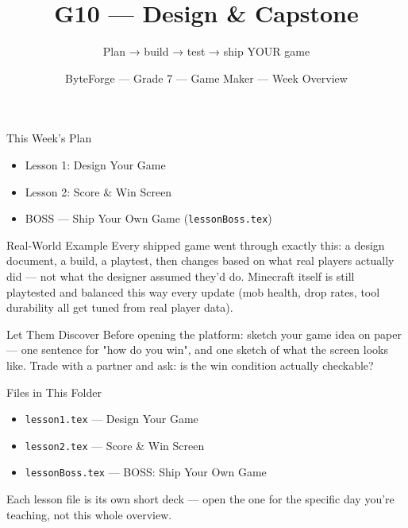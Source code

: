 \documentclass[aspectratio=169]{beamer}
\title{G10 — Design \& Capstone}
\subtitle{Plan → build → test → ship YOUR game}
\author{ByteForge --- Grade 7 --- Game Maker --- Week Overview}
\date{}
\begin{document}
\begin{frame}
    \titlepage
\end{frame}

\begin{frame}{This Week's Plan}
    \begin{itemize}
        \item Lesson 1: Design Your Game
        \item Lesson 2: Score \& Win Screen
        \item[$\bigstar$] BOSS --- Ship Your Own Game (\texttt{lessonBoss.tex})
    \end{itemize}
\end{frame}

\begin{frame}{Real-World Example}
    \Large
    Every shipped game went through exactly this: a design document, a build, a playtest, then changes based on what real players actually did — not what the designer assumed they'd do. Minecraft itself is still playtested and balanced this way every update (mob health, drop rates, tool durability all get tuned from real player data).
\end{frame}


\begin{frame}{Let Them Discover}
    \Large
    Before opening the platform: sketch your game idea on paper — one sentence for "how do you win", and one sketch of what the screen looks like. Trade with a partner and ask: is the win condition actually checkable?
\end{frame}

\begin{frame}{Files in This Folder}
    \small
    \begin{itemize}
        \item \texttt{lesson1.tex} --- Design Your Game
        \item \texttt{lesson2.tex} --- Score \& Win Screen
        \item \texttt{lessonBoss.tex} --- BOSS: Ship Your Own Game
    \end{itemize}
    \vspace{0.5em}
    \normalsize Each lesson file is its own short deck --- open the one for
    the specific day you're teaching, not this whole overview.
\end{frame}
\end{document}
